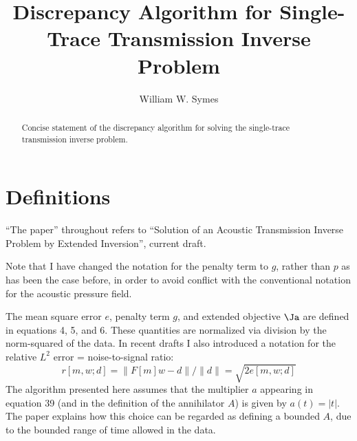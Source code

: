 \title{Discrepancy Algorithm for Single-Trace Transmission Inverse Problem}
\author{William W. Symes}



\maketitle
\begin{abstract}
  Concise statement of the discrepancy algorithm for solving the single-trace transmission inverse problem.
\end{abstract}

\section{Definitions}
``The paper'' throughout refers to ``Solution of an Acoustic Transmission Inverse Problem by Extended Inversion'', current draft.

Note that I have changed the notation for the penalty term to $g$, rather than $p$ as has been the case before, in order to avoid conflict with the conventional notation for the acoustic pressure field.

The mean square error $e$, penalty term $g$, and extended objective $\Ja $ are defined in equations 4, 5, and 6. These quantities are normalized via division by the norm-squared of the data. In recent drafts I also introduced a notation for the relative $L^2$ error = noise-to-signal ratio:
\begin{equation}
  \label{eqn:rmsgen}
  r[m,w;d] = \|F[m]w-d\|/\|d\| = \sqrt{2 e[m,w;d]}
\end{equation}
The algorithm presented here assumes that the multiplier $a$ appearing in equation 39 (and in the definition of the annihilator $A$) is given by $a(t)=|t|$. The paper explains how this choice can be regarded as defining a bounded $A$, due to the bounded range of time allowed in the data.

